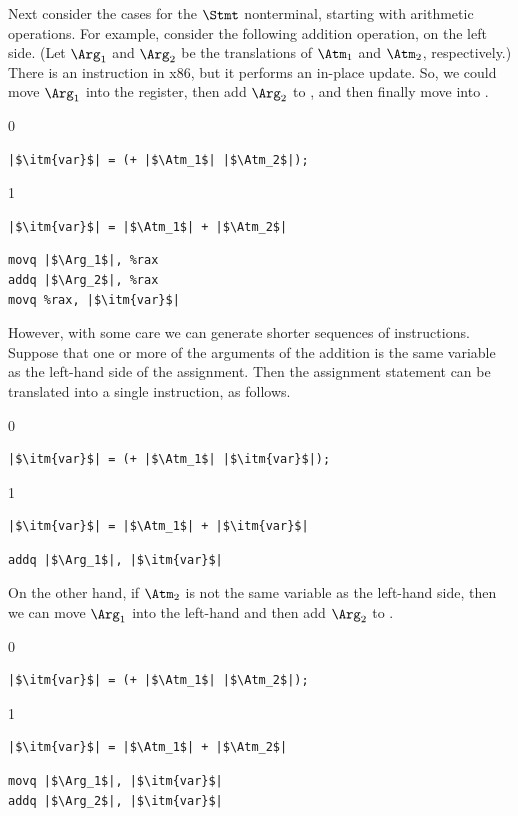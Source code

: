 \documentclass[7x10]{TimesAPriori_MIT}%
\def\racketEd{0}
\def\pythonEd{1}
\def\edition{1}
\newcommand{\pythonColor}[0]{}
\numberwithin{theorem}{chapter}
\numberwithin{definition}{chapter}
\numberwithin{equation}{chapter}
\begin{document}
Next consider the cases for the $\Stmt$ nonterminal, starting with
arithmetic operations. For example, consider the following addition
operation, on the left side.  (Let $\Arg_1$ and $\Arg_2$ be the
translations of $\Atm_1$ and $\Atm_2$, respectively.)  There is an
 instruction in x86, but it performs an in-place update.
%
So, we could move $\Arg_1$ into the  register, then add
$\Arg_2$ to , and then finally move  into . 
\begin{transformation}
{\if\edition\racketEd    
\begin{lstlisting}
|$\itm{var}$| = (+ |$\Atm_1$| |$\Atm_2$|);
\end{lstlisting}
\fi}
{\if\edition\pythonEd\pythonColor
\begin{lstlisting}
|$\itm{var}$| = |$\Atm_1$| + |$\Atm_2$|
\end{lstlisting}
\fi}
\compilesto
\begin{lstlisting}
movq |$\Arg_1$|, %rax
addq |$\Arg_2$|, %rax
movq %rax, |$\itm{var}$|
\end{lstlisting}
\end{transformation}
%
However, with some care we can generate shorter sequences of
instructions. Suppose that one or more of the arguments of the
addition is the same variable as the left-hand side of the assignment.
Then the assignment statement can be translated into a single
 instruction, as follows.
\begin{transformation}
{\if\edition\racketEd
\begin{lstlisting}
|$\itm{var}$| = (+ |$\Atm_1$| |$\itm{var}$|);
\end{lstlisting}
\fi}
{\if\edition\pythonEd\pythonColor
\begin{lstlisting}
|$\itm{var}$| = |$\Atm_1$| + |$\itm{var}$|
\end{lstlisting}
\fi}    
\compilesto
\begin{lstlisting}
addq |$\Arg_1$|, |$\itm{var}$|
\end{lstlisting}
\end{transformation}
%
On the other hand, if $\Atm_2$ is not the same variable as the
left-hand side, then we can move $\Arg_1$ into the left-hand 
and then add $\Arg_2$ to .
%
\begin{transformation}
{\if\edition\racketEd    
\begin{lstlisting}
|$\itm{var}$| = (+ |$\Atm_1$| |$\Atm_2$|);
\end{lstlisting}
\fi}
{\if\edition\pythonEd\pythonColor
\begin{lstlisting}
|$\itm{var}$| = |$\Atm_1$| + |$\Atm_2$|
\end{lstlisting}
\fi}
\compilesto
\begin{lstlisting}
movq |$\Arg_1$|, |$\itm{var}$|
addq |$\Arg_2$|, |$\itm{var}$|
\end{lstlisting}
\end{transformation}
\end{document}
